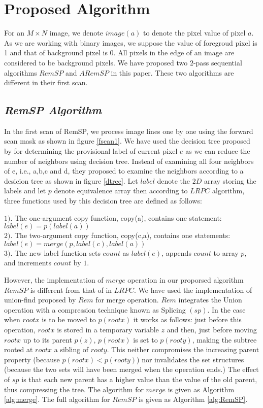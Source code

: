 \section{Proposed Algorithm}

For an $M \times N$ image, we denote $image(a)$ to denote the pixel value of pixel $a$. As we are working with
binary images, we suppose the value of foregroud pixel is 1 and that of background pixel is 0. All pixels in 
the edge of an image are considered to be background pixels. We have proposed two $2$-pass sequential algorithms
$RemSP$ and $ARemSP$ in this paper. These two algorithms are different in their first scan.

\subsection{\em{RemSP} Algorithm}
In the first scan of RemSP, we process image lines one by one using the forward scan mask as shown in figure \ref{fscan1}. We 
have used the decision tree proposed by \cite{Wu2009_LRPC} for determining the provisional label of current pixel
$e$ as we can reduce the number of neighbors using decision tree. Instead of examining all four neighbors of e, 
i.e., a,b,c and d, they proposed to examine the neighbors according to a desicion tree as shown in figure \ref{dtree}. Let $label$
denote the $2D$ array storing the labels and let $p$ denote equivalence array then according to $LRPC$ algorithm,
three functions used by this decision tree are defined as follows:

$1)$. The one-argument copy function, copy(a), contains one statement:
					$label(e) = p(label(a))$\\
$2)$. The two-argument copy function, copy(c,a), contains one statements:
				$label(e) = merge(p, label(c), label(a))$\\
$3)$. The new label function sets $count$ as $label(e)$, appends $count$ to array $p$, and increments $count$ by $1$.

However, the implementation of $merge$ operation in our proporsed algorithm $RemSP$ is different from that of in $LRPC$.
We have used the implementation of union-find proposed by $Rem$ \cite{Patwary2010_RemSP} for merge operation. $Rem$ 
integrates the Union operation with a compression technique known as Splicing $(sp)$. In the case when $rootx$ is to 
be moved to $p(rootx)$ it works as follows: just before this operation, $rootx$ is stored in a temporary variable $z$ and 
then, just before moving $rootx$ up to its parent $p(z)$, $p(rootx)$ is set to $p(rooty)$, making the subtree rooted at 
$rootx$ a sibling of $rooty$. This neither compromises the increasing parent property (because $p(rootx) < p(rooty)$) 
nor invalidates the set structures (because the two sets will have been merged when the operation ends.) The effect of $sp$
is that each new parent has a higher value than the value of the old parent, thus compressing the tree. The algorithm for
$merge$ is given as Algorithm \ref{alg:merge}. The full algorithm for $RemSP$ is
given as Algorithm \ref{alg:RemSP}.

